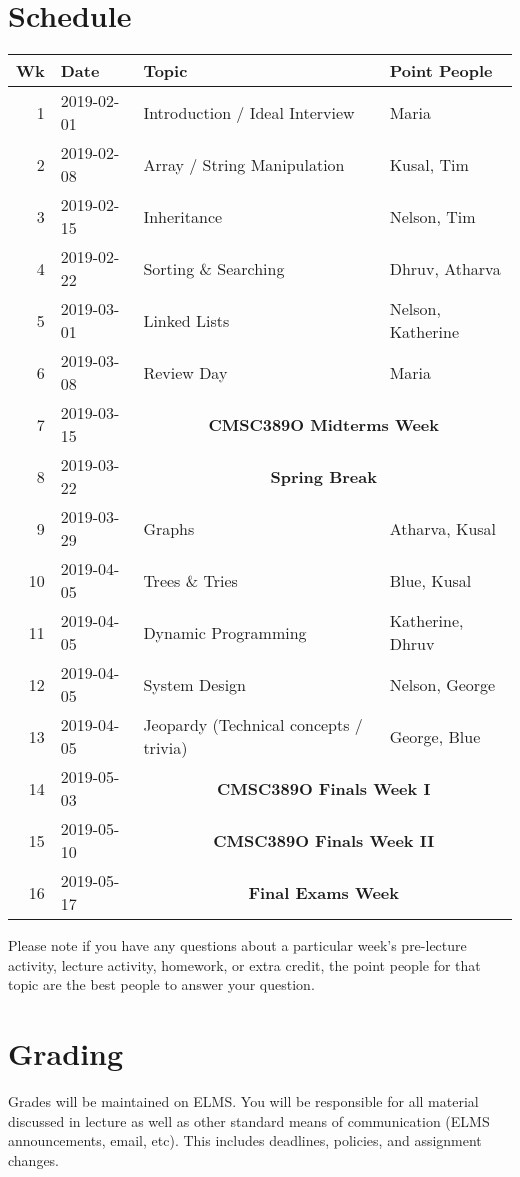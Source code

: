\documentclass[12pt]{article}
\begin{document}
\section*{Schedule}
\begin{table}[h!]
  \begin{tabular}{rlll}
    Wk & Date & Topic & Point People \\
    \hline
    1 & 2019-02-01 & Introduction / Ideal Interview & Maria \\
    2 & 2019-02-08 & Array / String Manipulation    & Kusal, Tim \\
    3 & 2019-02-15 & Inheritance                    & Nelson, Tim \\
    4 & 2019-02-22 & Sorting \& Searching           & Dhruv, Atharva \\
    5 & 2019-03-01 & Linked Lists                   & Nelson, Katherine \\
    6 & 2019-03-08 & Review Day                     & Maria \\
    7 & 2019-03-15 & \multicolumn{2}{c}{\textbf{CMSC389O Midterms Week}} \\
    8 & 2019-03-22 & \multicolumn{2}{c}{\textbf{Spring Break}} \\
    9 & 2019-03-29 & Graphs                         & Atharva, Kusal \\
    10& 2019-04-05 & Trees \& Tries                 & Blue, Kusal \\
    11& 2019-04-05 & Dynamic Programming            & Katherine, Dhruv \\
    12& 2019-04-05 & System Design                  & Nelson, George \\
    13& 2019-04-05 & Jeopardy (Technical concepts / trivia) & George, Blue \\
    14& 2019-05-03 & \multicolumn{2}{c}{\textbf{CMSC389O Finals Week I}} \\
    15& 2019-05-10 & \multicolumn{2}{c}{\textbf{CMSC389O Finals Week II}} \\
    16& 2019-05-17 & \multicolumn{2}{c}{\textbf{Final Exams Week}}
  \end{tabular}
\end{table}

Please note if you have any questions about a particular week’s pre-lecture activity, lecture activity, homework, or extra credit, the point people for that topic are the best people to answer your question.

\section*{Grading}
\noindent Grades will be maintained on ELMS.
You will be responsible for all material discussed in lecture as well as other standard means of communication (ELMS announcements, email, etc).
This includes deadlines, policies, and assignment changes.
\end{document}

